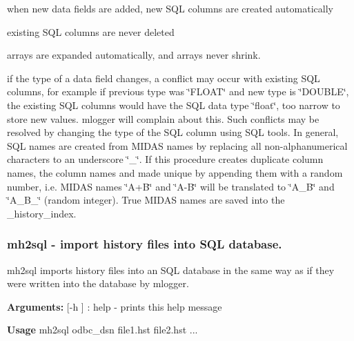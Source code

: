 \begin{DoxyItemize}
\item when new data fields are added, new SQL columns are created automatically 
\item existing SQL columns are never deleted 
\item arrays are expanded automatically, and arrays never shrink. 
\item if the type of a data field changes, a conflict may occur with existing SQL columns, for example if previous type was \char`\"{}FLOAT\char`\"{} and new type is \char`\"{}DOUBLE\char`\"{}, the existing SQL columns would have the SQL data type \char`\"{}float\char`\"{}, too narrow to store new values. mlogger will complain about this. Such conflicts may be resolved by changing the type of the SQL column using SQL tools. In general, SQL names are created from MIDAS names by replacing all non-\/alphanumerical characters to an underscore \char`\"{}\_\-\char`\"{}. If this procedure creates duplicate column names, the column names and made unique by appending them with a random number, i.e. MIDAS names \char`\"{}A+B\char`\"{} and \char`\"{}A-\/B\char`\"{} will be translated to \char`\"{}A\_\-B\char`\"{} and \char`\"{}A\_\-B\_\char`\"{} (random integer). True MIDAS names are saved into the \_\-history\_\-index. 
\end{DoxyItemize}

\par


\par
 \hypertarget{F_History_logging_F_mh2sql_utility}{}\subsubsection{mh2sql -\/ import history files into SQL database.}\label{F_History_logging_F_mh2sql_utility}
\par


mh2sql imports history files into an SQL database in the same way as if they were written into the database by mlogger.


\begin{DoxyItemize}
\item {\bfseries Arguments:} \mbox{[}-\/h \mbox{]} : help -\/ prints this help message
\end{DoxyItemize}


\begin{DoxyItemize}
\item {\bfseries  Usage } mh2sql odbc\_\-dsn file1.hst file2.hst ...
\end{DoxyItemize}


